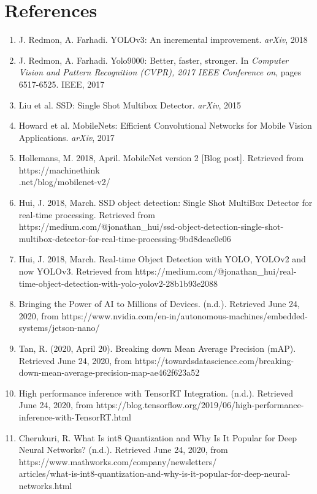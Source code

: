 \documentclass[12pt,letterpaper]{article}
\begin{document}

\section*{References}
\label{sec:refer}

\begin{enumerate}

    \item J. Redmon, A. Farhadi. YOLOv3: An incremental improvement. \textit{arXiv}, 2018 

    \item J. Redmon, A. Farhadi. Yolo9000: Better, faster, stronger. In \textit{Computer Vision and Pattern Recognition (CVPR), 2017 IEEE Conference on}, pages 6517-6525. IEEE, 2017

    \item Liu et al. SSD: Single Shot Multibox Detector. \textit{arXiv}, 2015
    
    \item Howard et al. MobileNets: Efficient Convolutional Networks for Mobile Vision Applications. \textit{arXiv}, 2017

    \item Hollemans, M. 2018, April. MobileNet version 2 [Blog post]. Retrieved from https://machinethink \\.net/blog/mobilenet-v2/

    \item Hui, J. 2018, March. SSD object detection: Single Shot MultiBox Detector for real-time processing. Retrieved from https://medium.com/@jonathan\_hui/ssd-object-detection-single-shot-multibox-detector-for-real-time-processing-9bd8deac0e06

    \item Hui, J. 2018, March. Real-time Object Detection with YOLO, YOLOv2 and now YOLOv3. Retrieved from https://medium.com/@jonathan\_hui/real-time-object-detection-with-yolo-yolov2-28b1b93e2088

    \item Bringing the Power of AI to Millions of Devices. (n.d.). Retrieved June 24, 2020, from https://www.nvidia.com/en-in/autonomous-machines/embedded-systems/jetson-nano/

    \item Tan, R. (2020, April 20). Breaking down Mean Average Precision (mAP). Retrieved June 24, 2020, from https://towardsdatascience.com/breaking-down-mean-average-precision-map-ae462f623a52

    \item High performance inference with TensorRT Integration. (n.d.). Retrieved June 24, 2020, from https://blog.tensorflow.org/2019/06/high-performance-inference-with-TensorRT.html

    \item Cherukuri, R. What Is int8 Quantization and Why Is It Popular for Deep Neural Networks? (n.d.). Retrieved June 24, 2020, from https://www.mathworks.com/company/newsletters/ \\ articles/what-is-int8-quantization-and-why-is-it-popular-for-deep-neural-networks.html
\end{enumerate}
\end{document}
